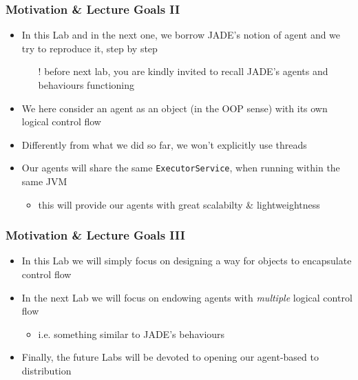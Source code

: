 \documentclass[presentation]{beamer}\mode<presentation>{\usetheme{AMSCesenaPurpleAndGold}}
\begin{document}
\begin{frame}
\frametitle{Motivation \& Lecture Goals II}

\begin{itemize}
	\item In this Lab and in the next one, we borrow \alert{JADE}'s notion of agent and we try to reproduce it, step by step
	\begin{itemize}
	    \item[!] \alert{before next lab}, you are kindly invited to recall JADE's agents and behaviours functioning
	\end{itemize}
	
	\vfill
	
	\item We here consider an agent as an object (in the OOP sense) with its own \alert{logical} control flow
	
	\vfill
	
	\item Differently from what we did so far, we won't explicitly use \alert{threads}
	
	\vfill
	
	\item Our agents will share the same \texttt{ExecutorService}, when running within the same JVM
	\begin{itemize}
	    \item this will provide our agents with great \alert{scalabilty \& lightweightness}
	\end{itemize}
\end{itemize}

\end{frame}

\begin{frame}
\frametitle{Motivation \& Lecture Goals III}

\begin{itemize}
	\item In this Lab we will simply focus on designing a way for objects to encapsulate control flow
	
	\vfill
	
	\item In the next Lab we will focus on endowing agents with \emph{multiple} \alert{logical} control flow
	\begin{itemize}
	    \item i.e. something similar to JADE's behaviours
	\end{itemize}
	
	\vfill
	
	\item Finally, the future Labs will be devoted to opening our agent-based to \alert{distribution}
	
\end{itemize}

\end{frame}
\end{document}
